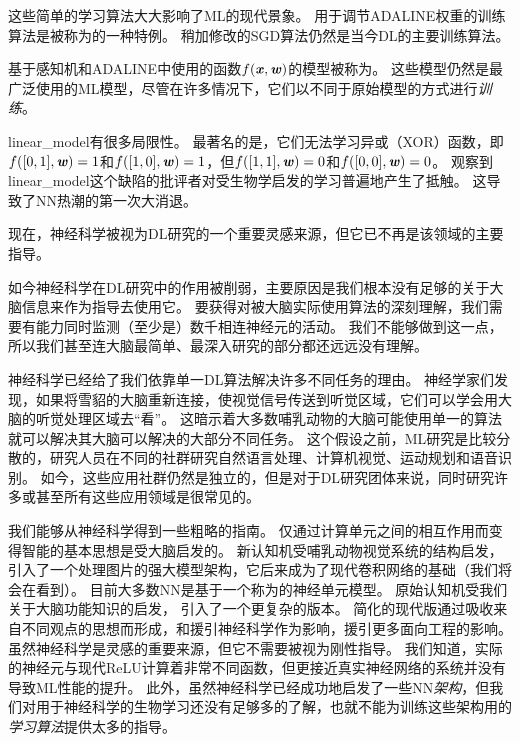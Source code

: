 这些简单的学习算法大大影响了\gls{ML}的现代景象。
用于调节ADALINE权重的训练算法是被称为的一种特例。
稍加修改的\gls{SGD}算法仍然是当今\gls{DL}的主要训练算法。

基于感知机和ADALINE中使用的函数$f(\boldsymbol{\mathit{x}}, \boldsymbol{\mathit{w}})$的模型被称为。
这些模型仍然是最广泛使用的\gls{ML}模型，尽管在许多情况下，它们以不同于原始模型的方式进行\emph{训练}。

\gls{linear_model}有很多局限性。
最著名的是，它们无法学习异或（XOR）函数，即$f([0,1], \boldsymbol{\mathit{w}}) = 1$和$f([1,0], \boldsymbol{\mathit{w}})=1$，但$f([1,1], \boldsymbol{\mathit{w}})=0$和$f([0,0],\boldsymbol{\mathit{w}})= 0$。
观察到\gls{linear_model}这个缺陷的批评者对受生物学启发的学习普遍地产生了抵触\citep{Minsky69}。
这导致了\gls{NN}热潮的第一次大消退。

现在，神经科学被视为\gls{DL}研究的一个重要灵感来源，但它已不再是该领域的主要指导。


如今神经科学在\gls{DL}研究中的作用被削弱，主要原因是我们根本没有足够的关于大脑信息来作为指导去使用它。
要获得对被大脑实际使用算法的深刻理解，我们需要有能力同时监测（至少是）数千相连神经元的活动。
我们不能够做到这一点，所以我们甚至连大脑最简单、最深入研究的部分都还远远没有理解\citep{olshausen:2005}。

神经科学已经给了我们依靠单一\gls{DL}算法解决许多不同任务的理由。
神经学家们发现，如果将雪貂的大脑重新连接，使视觉信号传送到听觉区域，它们可以学会用大脑的听觉处理区域去``看''\citep{von2000visual}。
这暗示着大多数哺乳动物的大脑可能使用单一的算法就可以解决其大脑可以解决的大部分不同任务。
这个假设之前，\gls{ML}研究是比较分散的，研究人员在不同的社群研究自然语言处理、计算机视觉、运动规划和语音识别。
如今，这些应用社群仍然是独立的，但是对于\gls{DL}研究团体来说，同时研究许多或甚至所有这些应用领域是很常见的。

我们能够从神经科学得到一些粗略的指南。
仅通过计算单元之间的相互作用而变得智能的基本思想是受大脑启发的。
新认知机\citep{Fukushima80}受哺乳动物视觉系统的结构启发，引入了一个处理图片的强大模型架构，它后来成为了现代卷积网络的基础\citep{LeCun98-small}（我们将会在看到）。
目前大多数\gls{NN}是基于一个称为的神经单元模型。
原始认知机\citep{Fukushima75}受我们关于大脑功能知识的启发， 引入了一个更复杂的版本。
简化的现代版通过吸收来自不同观点的思想而形成，\citet{Nair-2010}和\citet{Glorot+al-AI-2011-small}援引神经科学作为影响，\citet{Jarrett-ICCV2009}援引更多面向工程的影响。
虽然神经科学是灵感的重要来源，但它不需要被视为刚性指导。
我们知道，实际的神经元与现代\gls{ReLU}计算着非常不同函数，但更接近真实神经网络的系统并没有导致\gls{ML}性能的提升。
此外，虽然神经科学已经成功地启发了一些\gls{NN}\emph{架构}，但我们对用于神经科学的生物学习还没有足够多的了解，也就不能为训练这些架构用的\emph{学习算法}提供太多的指导。


